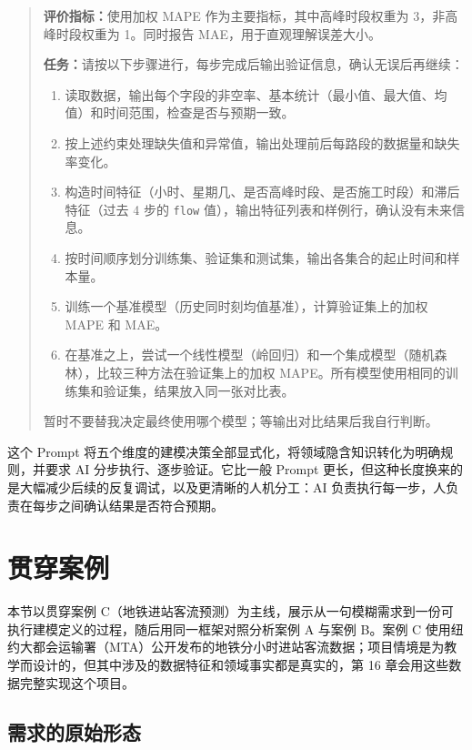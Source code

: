 \begin{quote}
\textbf{评价指标：}使用加权 MAPE 作为主要指标，其中高峰时段权重为 3，非高峰时段权重为 1。同时报告 MAE，用于直观理解误差大小。

\textbf{任务：}请按以下步骤进行，每步完成后输出验证信息，确认无误后再继续：

\begin{enumerate}
  \item 读取数据，输出每个字段的非空率、基本统计（最小值、最大值、均值）和时间范围，检查是否与预期一致。
  \item 按上述约束处理缺失值和异常值，输出处理前后每路段的数据量和缺失率变化。
  \item 构造时间特征（小时、星期几、是否高峰时段、是否施工时段）和滞后特征（过去 4 步的 \texttt{flow} 值），输出特征列表和样例行，确认没有未来信息。
  \item 按时间顺序划分训练集、验证集和测试集，输出各集合的起止时间和样本量。
  \item 训练一个基准模型（历史同时刻均值基准），计算验证集上的加权 MAPE 和 MAE。
  \item 在基准之上，尝试一个线性模型（岭回归）和一个集成模型（随机森林），比较三种方法在验证集上的加权 MAPE。所有模型使用相同的训练集和验证集，结果放入同一张对比表。
\end{enumerate}

暂时不要替我决定最终使用哪个模型；等输出对比结果后我自行判断。
\end{quote}

这个 Prompt 将五个维度的建模决策全部显式化，将领域隐含知识转化为明确规则，并要求 AI 分步执行、逐步验证。它比一般 Prompt 更长，但这种长度换来的是大幅减少后续的反复调试，以及更清晰的人机分工：AI 负责执行每一步，人负责在每步之间确认结果是否符合预期。

\section{贯穿案例}

本节以贯穿案例 C（地铁进站客流预测）为主线，展示从一句模糊需求到一份可执行建模定义的过程，随后用同一框架对照分析案例 A 与案例 B。案例 C 使用纽约大都会运输署（MTA）公开发布的地铁分小时进站客流数据\cite{mta2025hourly}；项目情境是为教学而设计的，但其中涉及的数据特征和领域事实都是真实的，第 16 章会用这些数据完整实现这个项目。

\subsection{需求的原始形态}

